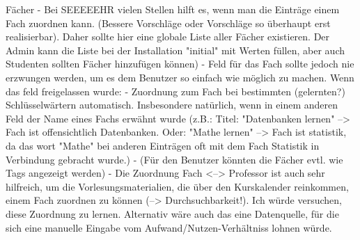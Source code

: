 Fächer %
    - Bei SEEEEEHR vielen Stellen hilft es, wenn man die Einträge einem Fach zuordnen kann. (Bessere Vorschläge oder Vorschläge so überhaupt erst realisierbar). Daher sollte hier eine globale Liste aller Fächer existieren. Der Admin kann die Liste bei der Installation "initial" mit Werten füllen, aber auch Studenten sollten Fächer hinzufügen können)
    - Feld für das Fach sollte jedoch nie erzwungen werden, um es dem Benutzer so einfach wie möglich zu machen. Wenn das feld freigelassen wurde: 
    - Zuordnung zum Fach bei bestimmten (gelernten?) Schlüsselwärtern automatisch. Insbesondere natürlich, wenn in einem anderen Feld der Name eines Fachs erwähnt wurde (z.B.: Titel: "Datenbanken lernen" --> Fach ist offensichtlich Datenbanken. Oder: "Mathe lernen" --> Fach ist statistik, da das wort "Mathe" bei anderen Einträgen oft mit dem Fach Statistik in Verbindung gebracht wurde.)
    - (Für den Benutzer könnten die Fächer evtl. wie Tags angezeigt werden)
    - Die Zuordnung Fach <--> Professor ist auch sehr hilfreich, um die Vorlesungsmaterialien, die über den Kurskalender reinkommen, einem Fach zuordnen zu können (--> Durchsuchbarkeit!). Ich würde versuchen, diese Zuordnung zu lernen. Alternativ wäre auch das eine Datenquelle, für die sich eine manuelle Eingabe vom Aufwand/Nutzen-Verhältniss lohnen würde.


